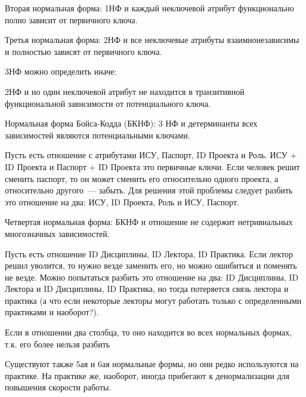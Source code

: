 \begin{definition}
  Вторая нормальная форма: 1НФ и каждый неключевой атрибут функционально полно
  зависит от первичного ключа.
\end{definition}

\begin{definition}
  Третья нормальная форма: 2НФ и все неключевые атрибуты взаимнонезависимы и
  полностью зависят от первичного ключа.
\end{definition}

3НФ можно определить иначе:

\begin{definition}
  2НФ и но один неключевой атрибут не находится в транзитивной функциональной
  зависимости от потенциального ключа.
\end{definition}

\begin{definition}
  Нормальная форма Бойса-Кодда (БКНФ): 3 НФ и детерминанты всех зависимостей
  являются потенциальными ключами.
\end{definition}

\begin{example}
  Пусть есть отношение с атрибутами ИСУ, Паспорт, ID Проекта и Роль. ИСУ +
   ID Проекта и Паспорт + ID Проекта это первичные ключи. Если человек решит
   сменить паспорт, то он может сменить его относительно одного проекта, а
   относительно другого~--- забыть. Для решения этой проблемы следует разбить
   это отношение на два: ИСУ, ID Проекта, Роль и ИСУ, Паспорт.
\end{example}

\begin{definition}
  Четвертая нормальная форма: БКНФ и отношение не содержит нетривиальных
  многозначных зависимостей.
\end{definition}

\begin{example}
  Пусть есть отношение ID Дисциплины, ID Лектора, ID Практика. Если лектор решил
  уволится, то нужно везде заменить его, но можно ошибиться и поменять не везде.
  Можно попытаться разбить это отношение на два: ID Дисциплины, ID Лектора и ID
  Дисциплины, ID Практика, но тогда потеряется связь лектора и практика (а что
  если некоторые лекторы могут работать только с определенными практиками и
  наоборот?).
\end{example}

\begin{remark}
  Если в отношении два столбца, то оно находится во всех нормальных формах, т.к.
  его более нельзя разбить
\end{remark}

\begin{remark}
  Существуют также 5ая и 6ая нормальные формы, но они редко используются на
  практике. На практике же, наоборот, иногда прибегают к денормализации для
  повышения скорости работы.
\end{remark}
